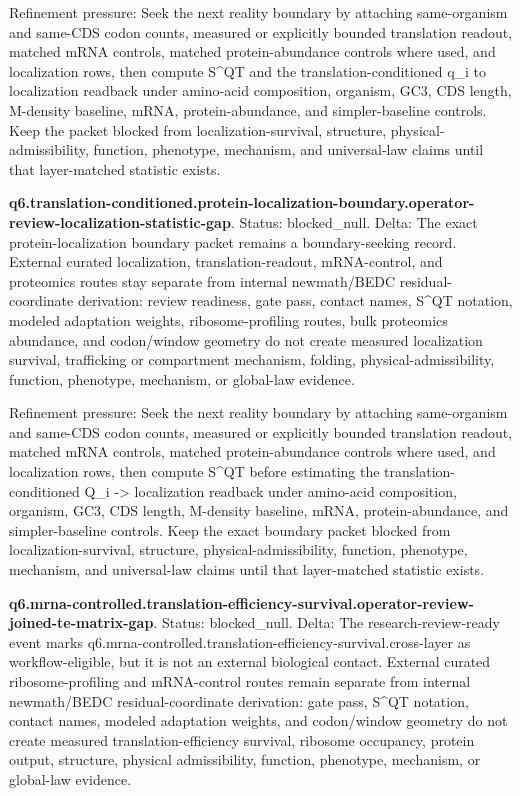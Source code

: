 Refinement pressure: Seek the next reality boundary by attaching same-organism and same-CDS codon counts, measured or explicitly bounded translation readout, matched mRNA controls, matched protein-abundance controls where used, and localization rows, then compute S\textasciicircum{}QT and the translation-conditioned q\_i to localization readback under amino-acid composition, organism, GC3, CDS length, M-density baseline, mRNA, protein-abundance, and simpler-baseline controls. Keep the packet blocked from localization-survival, structure, physical-admissibility, function, phenotype, mechanism, and universal-law claims until that layer-matched statistic exists.

\textbf{q6.translation-conditioned.protein-localization-boundary.operator-review-localization-statistic-gap}. Status: blocked\_null. Delta: The exact protein-localization boundary packet remains a boundary-seeking record. External curated localization, translation-readout, mRNA-control, and proteomics routes stay separate from internal newmath/BEDC residual-coordinate derivation: review readiness, gate pass, contact names, S\textasciicircum{}QT notation, modeled adaptation weights, ribosome-profiling routes, bulk proteomics abundance, and codon/window geometry do not create measured localization survival, trafficking or compartment mechanism, folding, physical-admissibility, function, phenotype, mechanism, or global-law evidence.

Refinement pressure: Seek the next reality boundary by attaching same-organism and same-CDS codon counts, measured or explicitly bounded translation readout, matched mRNA controls, matched protein-abundance controls where used, and localization rows, then compute S\textasciicircum{}QT before estimating the translation-conditioned Q\_i -> localization readback under amino-acid composition, organism, GC3, CDS length, M-density baseline, mRNA, protein-abundance, and simpler-baseline controls. Keep the exact boundary packet blocked from localization-survival, structure, physical-admissibility, function, phenotype, mechanism, and universal-law claims until that layer-matched statistic exists.

\textbf{q6.mrna-controlled.translation-efficiency-survival.operator-review-joined-te-matrix-gap}. Status: blocked\_null. Delta: The research-review-ready event marks q6.mrna-controlled.translation-efficiency-survival.cross-layer as workflow-eligible, but it is not an external biological contact. External curated ribosome-profiling and mRNA-control routes remain separate from internal newmath/BEDC residual-coordinate derivation: gate pass, S\textasciicircum{}QT notation, contact names, modeled adaptation weights, and codon/window geometry do not create measured translation-efficiency survival, ribosome occupancy, protein output, structure, physical admissibility, function, phenotype, mechanism, or global-law evidence.


